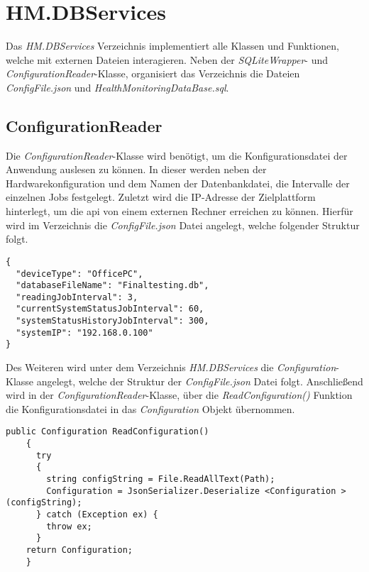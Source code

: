 \newpage
\section{HM.DBServices}\label{sec:HMDBServices}
Das \textit{HM.DBServices} Verzeichnis implementiert alle Klassen und Funktionen, welche mit externen Dateien interagieren. Neben der \textit{SQLiteWrapper}- und \textit{ConfigurationReader}-Klasse, organisiert das Verzeichnis die Dateien \textit{ConfigFile.json} und \textit{HealthMonitoringDataBase.sql}.

\subsection*{ConfigurationReader}
Die \textit{ConfigurationReader}-Klasse wird benötigt, um die Konfigurationsdatei der Anwendung auslesen zu können. In dieser werden neben der Hardwarekonfiguration und dem Namen der Datenbankdatei, die Intervalle der einzelnen Jobs festgelegt. Zuletzt wird die IP-Adresse der Zielplattform hinterlegt, um die \ac{api} von einem externen Rechner erreichen zu können.
Hierfür wird im Verzeichnis die \textit{ConfigFile.json} Datei angelegt, welche folgender Struktur folgt.
\begin{lstlisting}[caption={Konfigurationsdatei der Hardware-Health-Monitor Anwendung}, label={lst:ConfigFileStrukture}]
{
  "deviceType": "OfficePC",
  "databaseFileName": "Finaltesting.db",
  "readingJobInterval": 3,
  "currentSystemStatusJobInterval": 60,
  "systemStatusHistoryJobInterval": 300,
  "systemIP": "192.168.0.100"
}
\end{lstlisting}
Des Weiteren wird unter dem Verzeichnis \textit{HM.DBServices} die \textit{Configuration}-Klasse angelegt, welche der Struktur der \textit{ConfigFile.json} Datei folgt. Anschließend wird in der \textit{ConfigurationReader}-Klasse, über die \textit{ReadConfiguration()} Funktion die Konfigurationsdatei in das \textit{Configuration} Objekt übernommen.
\begin{lstlisting}[caption={\textit{ReadConfiguration()} Funktion der \textit{ConfigurationReader}-Klasse}, label={lst:ReadConfiguration}]
    public Configuration ReadConfiguration()
    {
      try
      {
        string configString = File.ReadAllText(Path);    
        Configuration = JsonSerializer.Deserialize <Configuration >(configString);
      } catch (Exception ex) {
        throw ex; 
      }
    return Configuration;
    }\end{lstlisting}

